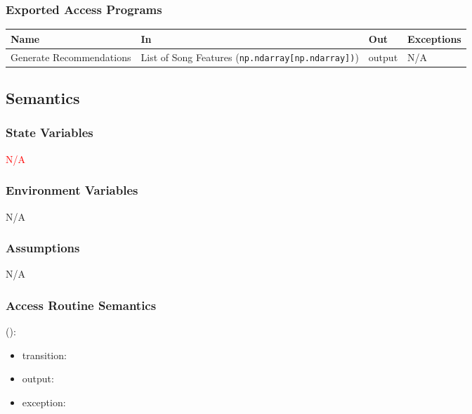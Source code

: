 \documentclass[12pt, titlepage]{article}
\begin{document}
\subsubsection{Exported Access Programs}

\begin{center}
\begin{tabular}{p{2cm} p{4cm} p{4cm} p{2cm}}
\hline
\textbf{Name} & \textbf{In} & \textbf{Out} & \textbf{Exceptions}\\
\hline
Generate Recommendations &List of Song Features (\texttt{np.ndarray[\texttt{np.ndarray}])}) &output &N/A\\
\hline
\end{tabular}
\end{center}

\subsection{Semantics}

\subsubsection{State Variables}
\textcolor{red}{N/A}

\subsubsection{Environment Variables}
N/A

\subsubsection{Assumptions}
N/A

\subsubsection{Access Routine Semantics}

\noindent {}():
\begin{itemize}
\item transition:  
\item output:  
\item exception:  
\end{itemize}

\end{document}
